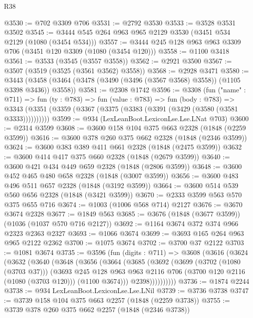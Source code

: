 \begin{lexlean}{R38}
\begin{coremodule}
@3530 := @702 @3309 @706
@3531 := @2792 @3530
@3533 := @3528 @3531 @3502
@3545 := @3444 @545 @264 @963 @965 @2129 @3530 (@3451 @534 @2129 (@1080 (@3454 @534)))
@3557 := @3444 @245 @128 @963 @963 @3309 @706 (@3451 @120 @3309 (@1080 (@3454 @120)))
@3558 := @1100 @3418
@3561 := @3533 (@3545 (@3557 @3558))
@3562 := @2921 @3500
@3567 := @3507 (@3519 (@3525 (@3561 @3562) @3558))
@3568 := @2928 @3471
@3580 := @3443 (@3458 (@3464 (@3478 (@3490 (@3496 (@3567 @3568) @3558)) (@1105 @3398 @3436)) @3558))
@3581 := @2308 @1742
@3596 := @3308
    (fun ("name" : @711) =>
    fun (ty : @783) =>
    fun (value : @783) =>
    fun (body : @783) =>
    @3343 (@3351 (@3359 (@3367 (@3375 (@3383 (@3391 (@3429 (@3580 (@3581 @3333))))))))))
@3599 := @934 (LexLeanBoot.LexiconLse.Lse.LNat @703)
@3600 := @2314 @3599
@3608 := @3600 @158 @104 @375 @663 @2328 (@1848 (@2259 @3599))
@3616 := @3600 @378 @260 @375 @662 @2328 (@1848 (@2346 @3599))
@3624 := @3600 @383 @389 @411 @661 @2328 (@1848 (@2475 @3599))
@3632 := @3600 @414 @417 @375 @660 @2328 (@1848 (@2679 @3599))
@3640 := @3600 @421 @434 @449 @659 @2328 (@1848 (@2806 @3599))
@3648 := @3600 @452 @465 @480 @658 @2328 (@1848 (@3007 @3599))
@3656 := @3600 @483 @496 @511 @657 @2328 (@1848 (@3192 @3599))
@3664 := @3600 @514 @539 @560 @656 @2328 (@1848 (@3421 @3599))
@3670 := @2333 @3599 @563 @570 @375 @655 @716
@3674 := @1003 (@1006 @568 @714) @2127
@3676 := @3670 @3674 @2328
@3677 := @1849 @563
@3685 := @3676 (@1848 (@3677 @3599)) (@1036 (@1037 @570 @716 @2127))
@3692 := @1164 @3674 @372 @374 @966 @2323 @2363 @2327
@3693 := @1066 @3674
@3699 := @3693 @165 @264 @963 @965 @2122 @2362
@3700 := @1075 @3674
@3702 := @3700 @37 @2122
@3703 := @1081 @3674
@3735 := @3596
    (fun (digits : @711) =>
    @3608
      (@3616
        (@3624
          (@3632
            (@3640
              (@3648
                (@3656
                  (@3664
                    (@3685
                      (@3692
                        (@3699
                          (@3702 (@1080 (@3703 @37)))
                          (@3693
                            @245
                            @128
                            @963
                            @963
                            @2116
                            @706
                            (@3700 @120 @2116 (@1080 (@3703 @120)))
                            (@1100 @3674)))
                        @2398))))))))))
@3736 := @1874 @2244
@3738 := @934 LexLeanBoot.LexiconLse.Lse.LNil
@3739 := @3736 @3738
@3747 := @3739 @158 @104 @375 @663 @2257 (@1848 (@2259 @3738))
@3755 := @3739 @378 @260 @375 @662 @2257 (@1848 (@2346 @3738))

\end{coremodule}
\end{lexlean}
